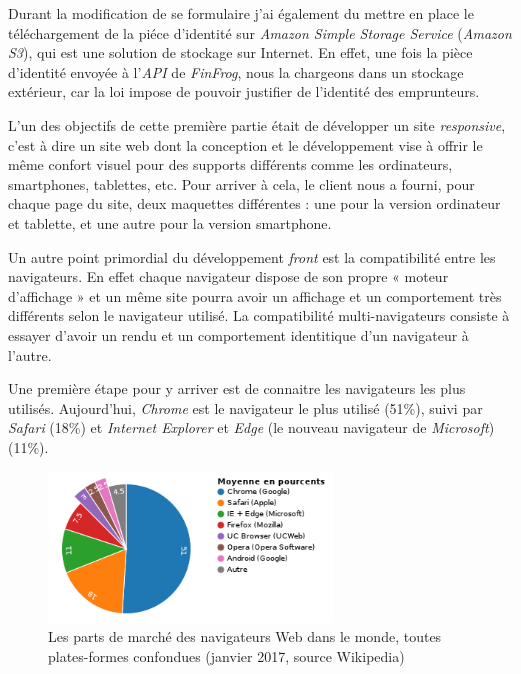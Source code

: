 \bigskip

Durant la modification de se formulaire j'ai également du mettre en
place le téléchargement de la piéce d'identité sur \emph{Amazon Simple
Storage Service} (\emph{Amazon S3}), qui est une solution de stockage
sur Internet. En effet, une fois la pièce d'identité envoyée à
l'\emph{API} de \emph{FinFrog}, nous la chargeons dans un stockage
extérieur, car la loi impose de pouvoir justifier de l'identité des
emprunteurs.

\bigskip

L'un des objectifs de cette première partie était de développer un site
\emph{responsive}, c'est à dire un site web dont la conception et le
développement vise à offrir le même confort visuel pour des supports
différents comme les ordinateurs, smartphones, tablettes, etc. Pour
arriver à cela, le client nous a fourni, pour chaque page du site, deux
maquettes différentes : une pour la version ordinateur et tablette, et
une autre pour la version smartphone.

\bigskip

Un autre point primordial du développement \emph{front} est la
compatibilité entre les navigateurs. En effet chaque navigateur dispose
de son propre « moteur d'affichage » et un même site pourra avoir un
affichage et un comportement très différents selon le navigateur
utilisé. La compatibilité multi-navigateurs consiste à essayer d'avoir
un rendu et un comportement identitique d'un navigateur à l'autre.

\bigskip

Une première étape pour y arriver est de connaitre les navigateurs les
plus utilisés. Aujourd'hui, \emph{Chrome} est le navigateur le plus
utilisé (51\%), suivi par \emph{Safari} (18\%) et \emph{Internet
Explorer} et \emph{Edge} (le nouveau navigateur de \emph{Microsoft})
(11\%).

\begin{figure}[h]
  \centering
  \includegraphics[height=4cm]{figures/browsers.png}
  \caption{Les parts de marché des navigateurs Web dans le monde, toutes plates-formes confondues (janvier 2017, source Wikipedia)}
\end{figure}


